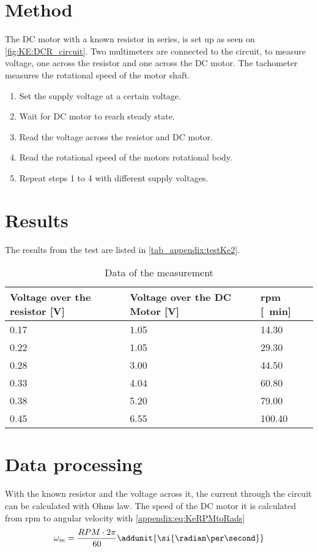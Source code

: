 \section*{Method}
The DC motor with a known resistor in series, is set up as seen on \autoref{fig:KE:DCR_circuit}. Two multimeters are connected to the circuit, to measure voltage, one across the resistor and one across the DC motor. The tachometer measures the rotational speed of the motor shaft.%
\begin{enumerate}
\item Set the supply voltage at a certain voltage.
\item Wait for DC motor to reach steady state.
\item Read the voltage across the resistor and DC motor.
\item Read the rotational speed of the motors rotational body.
\item Repeat steps 1 to 4 with different supply voltages.
\end{enumerate}
\section*{Results}
The results from the test are listed in \autoref{tab_appendix:testKe2}.
\begin{table} [!h]
	\centering
	\caption{Data of the measurement}\label{tab_appendix:testKe2}
	\begin{tabularx}{\textwidth}{llX}
		Voltage over the resistor [\si{\volt}]& Voltage over the DC Motor [\si{\volt}]	& 	\gls{rpm} [\si{\per\minute}]						\\ \toprule \rowcolor{lightGrey}
0.17 & 1.05 & 14.30	\\
0.22 & 1.05 & 29.30 \\ \rowcolor{lightGrey}
0.28 & 3.00 & 44.50 \\
0.33 & 4.04 & 60.80 \\ \rowcolor{lightGrey}
0.38 & 5.20 & 79.00 \\
0.45 & 6.55 & 100.40 \\ 
	\end{tabularx}
\end{table}

\newpage
\section*{Data processing}
With the known resistor and the voltage across it, the current through the circuit can be calculated with Ohms law.
The speed of the DC motor it is calculated from \gls{rpm} to angular velocity with \autoref{appendix:eq:KeRPMtoRads}
\begin{equation}
\omega_m = \frac{RPM \cdot 2 \pi}{60}\addunit{\si{\radian\per\second}} \label{appendix:eq:KeRPMtoRads}
\end{equation}

